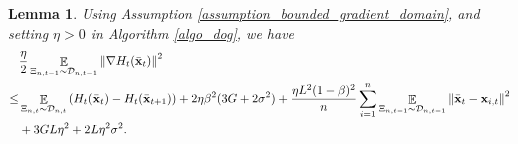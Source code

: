 \documentclass{article}
\newtheorem{Lemma}{\bf{Lemma}}
\begin{document}
\begin{Lemma}
\label{lemma_gradient_norm_bound}
Using Assumption \ref{assumption_bounded_gradient_domain}, and setting $\eta>0$ in Algorithm \ref{algo_dog}, we have 
\begin{align}
\nonumber
& \frac{\eta}{2}\mathop{\mathbb{E}}_{ \Xi_{n,t-1} \sim \mathcal{D}_{n,t-1} }\left\lVert\nabla H_t(\bar{{\bf x}}_t)\right\rVert^2  \\ \nonumber 
\le & \mathop{\mathbb{E}}_{ \Xi_{n,t} \sim \mathcal{D}_{n,t} } \left( H_t(\bar{{\bf x}}_t) - H_t(\bar{{\bf x}}_{t+1}) \right) + 2\eta\beta^2(3G + 2\sigma^2) +  \frac{\eta L^2(1-\beta)^2}{n}\sum_{i=1}^n\mathop{\mathbb{E}}_{ \Xi_{n,t-1} \sim \mathcal{D}_{n,t-1} }\left\lVert\bar{{\bf x}}_t - {\bf x}_{i,t} \right\rVert^2 \\ \label{equa_lemma_gradient_norm_bound}  
& + 3GL\eta^2  + 2L\eta^2 \sigma^2.
\end{align}
\end{Lemma}
\end{document}
